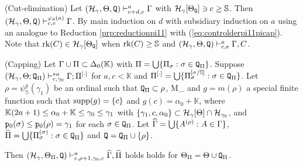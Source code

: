 \documentclass{article}
\newcommand{\mS}{\mathbb{S}}
\newcommand{\mK}{\mathbb{K}}
\begin{document}
\bprp\label{lem:predceregcap}{\rm (Cut-elimination)}
Let $(\mathcal{H}_{\gamma},\Theta,{\tt Q})\vdash^{a}_{c+d,e}\Gamma$ with
$\calh_{\gam}[\Tht_{{\tt Q}}]\ni c\geq\mS$.
Then $(\mathcal{H}_{\gamma},\Theta,{\tt Q})\vdash^{\varphi_{d}(a)}_{c,e}\Gamma$.
\eprp
\bprf
By main induction on $d$ with subsidiary induction on $a$ using
an analogue to
Reduction \ref{prp:reductionpi11} with (\ref{eq:controlderpi11picap}).
Note that $\mbox{{\rm rk}}(C)\in{\cal H}_{\gamma}[\Theta_{{\tt Q}}]$ when
$\rk(C)\geq\mS$ and $(\mathcal{H}_{\gamma},\Theta,{\tt Q})\vdash^{a}_{c,e}\Gamma,C$.
\eprf











\blem\label{lem:capping}{\rm (Capping)}
Let
$\Gam\cup\Pi\subset\Del_{0}(\mK)$ with $\Pi=\bigcup\{\Pi_{\sigma}: \sigma\in{\tt Q}_{\Pi}\}$.
Suppose
$
(\mathcal{H}_{\gamma},\Theta;{\tt Q}_{\Pi}
)\vdash^{* a}_{c,\gamma_{0}}\Gamma;\Pi^{[\cdot]}
$ for $a,c<\mK$ and $\Pi^{[\cdot]}=\bigcup\{\Pi_{\sig}^{[\sig/\mS]}: \sig\in{\tt Q}_{\Pi}\}$.
Let
$\rho=\psi_{\mathbb{S}}^{g}(\gamma_{1})$
be an ordinal such that 
${\tt Q}_{\Pi}\subset\rho$,
\beqn\label{eq:capping}
\Tht\subset M_{\rho}
\eeqn
and
$g=m(\rho)$ a special finite function such that
${\rm supp}(g)=\{c\}$ and $g(c)=\alpha_{0}+\mathbb{K}$, where
$\mathbb{K}(2a+1)\leq\alpha_{0}+\mathbb{K}\leq\gamma_{0}\leq\gamma_{1}$
with 
$\{\gamma_{1},c,\alpha_{0}\}\subset\mathcal{H}_{\gamma}[\Theta]\cap{\cal H}_{\gamma_{0}}$,
and ${\tt p}_{0}(\sigma)\leq{\tt p}_{0}(\rho)=\gamma_{1}$ for each $\sigma\in{\tt Q}_{\Pi}$.
Let
$\widehat{\Gamma}=\bigcup\{A^{(\rho)}: A\in\Gamma\}$,
$\widehat{\Pi}=\bigcup\{\Pi_{\sigma}^{(\sigma)}: \sigma\in{\tt Q}_{\Pi}\}$ and
${\tt Q}= {\tt Q}_{\Pi}\cup\{\rho\}$.


Then 
$(\mathcal{H}_{\gamma},\Theta_{\Pi}, {\tt Q})
\vdash^{a}_{c,\rho+1,\gamma_{0},c}
\widehat{\Gamma},\widehat{\Pi}$ holds holds for
$\Theta_{\Pi}=\Theta\cup{\tt Q}_{\Pi}$.
\end{document}
